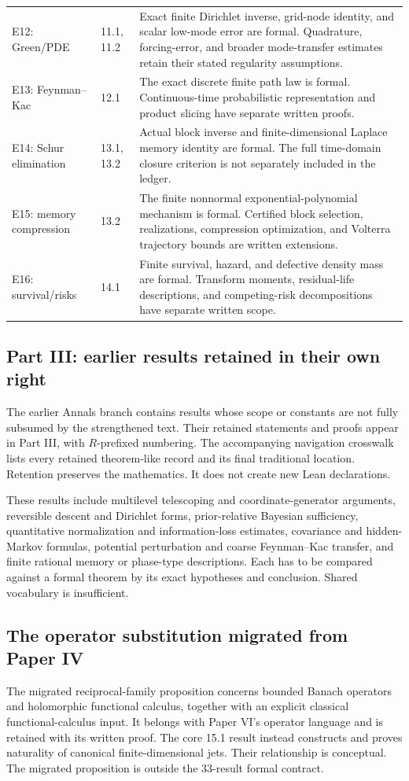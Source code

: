 \begin{longtable}{@{}p{.24\linewidth}p{.18\linewidth}p{.51\linewidth}@{}}
E12: Green/PDE & 11.1, 11.2 & Exact finite Dirichlet inverse, grid-node identity, and scalar low-mode error are formal. Quadrature, forcing-error, and broader mode-transfer estimates retain their stated regularity assumptions.\\
E13: Feynman--Kac & 12.1 & The exact discrete finite path law is formal. Continuous-time probabilistic representation and product slicing have separate written proofs.\\
E14: Schur elimination & 13.1, 13.2 & Actual block inverse and finite-dimensional Laplace memory identity are formal. The full time-domain closure criterion is not separately included in the ledger.\\
E15: memory compression & 13.2 & The finite nonnormal exponential-polynomial mechanism is formal. Certified block selection, realizations, compression optimization, and Volterra trajectory bounds are written extensions.\\
E16: survival/risks & 14.1 & Finite survival, hazard, and defective density mass are formal. Transform moments, residual-life descriptions, and competing-risk decompositions have separate written scope.\\
\bottomrule\end{longtable}

\subsection{Part III: earlier results retained in their own right}
The earlier Annals branch contains results whose scope or constants are not fully subsumed by the strengthened text. Their retained statements and proofs appear in Part III, with $R$-prefixed numbering. The accompanying navigation crosswalk lists every retained theorem-like record and its final traditional location. Retention preserves the mathematics. It does not create new Lean declarations.

These results include multilevel telescoping and coordinate-generator arguments, reversible descent and Dirichlet forms, prior-relative Bayesian sufficiency, quantitative normalization and information-loss estimates, covariance and hidden-Markov formulas, potential perturbation and coarse Feynman--Kac transfer, and finite rational memory or phase-type descriptions. Each has to be compared against a formal theorem by its exact hypotheses and conclusion. Shared vocabulary is insufficient.

\subsection{The operator substitution migrated from Paper IV}
The migrated reciprocal-family proposition concerns bounded Banach operators and holomorphic functional calculus, together with an explicit classical functional-calculus input. It belongs with Paper VI's operator language and is retained with its written proof. The core 15.1 result instead constructs and proves naturality of canonical finite-dimensional jets. Their relationship is conceptual. The migrated proposition is outside the 33-result formal contract.


